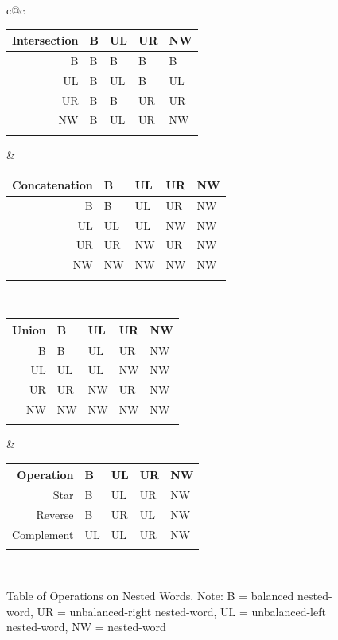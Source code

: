\documentclass{llncs}
\begin{document}
\begin{figure}[htb]
  \centering
\begin{tabular}{c@{\hspace{1cm}}c}
  \begin{tabular}{|| r | l | l | l | l ||}
\hhline{|t:=====:t|}
    Intersection & B & UL & UR & NW \\
\hline
    B & B & B & B & B \\
\hline
    UL & B & UL & B & UL \\
\hline
    UR & B & B & UR & UR \\
\hline
    NW & B & UL & UR & NW \\
\hhline{|b:=====:b|}
  \end{tabular}
\vspace{1cm} &
  \begin{tabular}{|| r | l | l | l | l ||}
\hhline{|t:=====:t|}
    Concatenation & B & UL & UR & NW \\
\hline
    B & B & UL & UR & NW \\
\hline
    UL & UL & UL & NW & NW \\
\hline
    UR & UR & NW & UR & NW \\
\hline
    NW & NW & NW & NW & NW \\
\hhline{|b:=====:b|}
  \end{tabular} \\
\vspace{1cm}
  \begin{tabular}{|| r | l | l | l | l ||}
\hhline{|t:=====:t|}
    Union & B & UL & UR & NW \\
\hline
    B & B & UL & UR & NW \\
\hline
    UL & UL & UL & NW & NW \\
\hline
    UR & UR & NW & UR & NW \\
\hline
    NW & NW & NW & NW & NW \\
\hhline{|b:=====:b|}
  \end{tabular} &
  \begin{tabular}{|| r | l | l | l | l ||}
\hhline{|t:=====:t|}
    Operation & B & UL & UR & NW \\
\hline
    Star & B & UL & UR & NW \\
\hline
    Reverse & B & UR & UL & NW \\
\hline
    Complement & UL & UL & UR & NW \\
\hhline{|b:=====:b|}
  \end{tabular} \\
\end{tabular}
  \caption{Table of Operations on Nested Words. Note: B = balanced nested-word, UR = unbalanced-right nested-word, UL = unbalanced-left nested-word, NW = nested-word}
  \label{Fig:Ops}
\end{figure}
\end{document}

